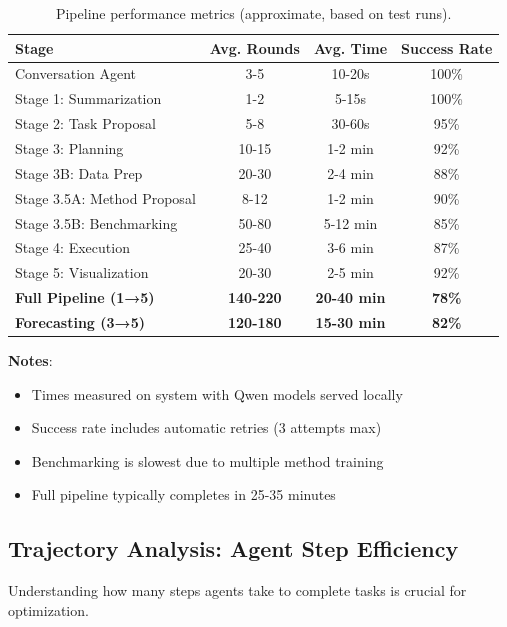 \documentclass[11pt,a4paper]{article}
\begin{document}
\begin{table}[H]
\centering
\small
\begin{tabular}{lccc}
\toprule
\textbf{Stage} & \textbf{Avg. Rounds} & \textbf{Avg. Time} & \textbf{Success Rate} \\
\midrule
Conversation Agent & 3-5 & 10-20s & 100\% \\
Stage 1: Summarization & 1-2 & 5-15s & 100\% \\
Stage 2: Task Proposal & 5-8 & 30-60s & 95\% \\
Stage 3: Planning & 10-15 & 1-2 min & 92\% \\
Stage 3B: Data Prep & 20-30 & 2-4 min & 88\% \\
Stage 3.5A: Method Proposal & 8-12 & 1-2 min & 90\% \\
Stage 3.5B: Benchmarking & 50-80 & 5-12 min & 85\% \\
Stage 4: Execution & 25-40 & 3-6 min & 87\% \\
Stage 5: Visualization & 20-30 & 2-5 min & 92\% \\
\midrule
\textbf{Full Pipeline (1→5)} & \textbf{140-220} & \textbf{20-40 min} & \textbf{78\%} \\
\textbf{Forecasting (3→5)} & \textbf{120-180} & \textbf{15-30 min} & \textbf{82\%} \\
\bottomrule
\end{tabular}
\caption{Pipeline performance metrics (approximate, based on test runs).}
\end{table}

\textbf{Notes}:
\begin{itemize}
    \item Times measured on system with Qwen models served locally
    \item Success rate includes automatic retries (3 attempts max)
    \item Benchmarking is slowest due to multiple method training
    \item Full pipeline typically completes in 25-35 minutes
\end{itemize}

\subsection{Trajectory Analysis: Agent Step Efficiency}

Understanding how many steps agents take to complete tasks is crucial for optimization.
\end{document}

